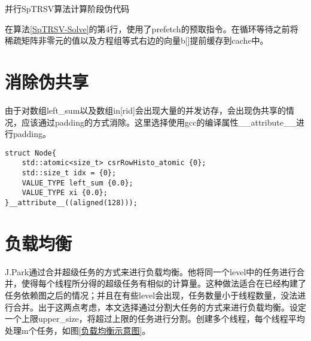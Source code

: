 \begin{algorithm}[htbp]
    \caption{并行SpTRSV算法计算阶段伪代码\label{SpTRSV-Solve}}
\end{algorithm}

在算法\ref{SpTRSV-Solve}的第4行，使用了prefetch的预取指令。在循环等待之前将稀疏矩阵非零元的值以及方程组等式右边的向量b[]提前缓存到cache中。

\section{消除伪共享}

由于对数组left\_sum以及数组in[rid]会出现大量的并发访存，会出现伪共享的情况，应该通过padding的方式消除。这里选择使用gcc的编译属性\_\_attribute\_\_进行padding。

\begin{lstlisting}[caption={消除伪共享}]
struct Node{
    std::atomic<size_t> csrRowHisto_atomic {0};
    std::size_t idx = {0};
    VALUE_TYPE left_sum {0.0};
    VALUE_TYPE xi {0.0};
}__attribute__((aligned(128)));
\end{lstlisting}

\section{负载均衡}\label{section:fuzaijunheng}

J.Park\cite{park2014sparsifying}通过合并超级任务的方式来进行负载均衡。他将同一个level中的任务进行合并，使得每个线程所分得的超级任务有相似的计算量。这种做法适合在已经构建了任务依赖图之后的情况；并且在有些level会出现，任务数量小于线程数量，没法进行合并。出于这两点考虑，本文选择通过分割大任务的方式来进行负载均衡。设定一个上限upper\_size，将超过上限的任务进行分割。创建多个线程，每个线程平均处理m个任务，如图\ref{负载均衡示意图}。

